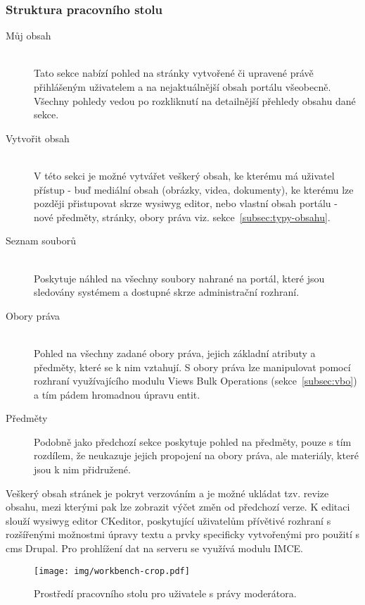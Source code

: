 \subsubsection*{Struktura pracovního stolu}
\begin{description}
  \item[Můj obsah] \hfill \\
  Tato sekce nabízí pohled na stránky vytvořené či upravené právě přihlášeným uživatelem a na nejaktuálnější obsah portálu všeobecně. Všechny pohledy vedou po rozkliknutí na detailnější přehledy obsahu dané sekce.  
  \item [Vytvořit obsah] \hfill \\
  V této sekci je možné vytvářet veškerý obsah, ke kterému má uživatel přístup - buď mediální obsah (obrázky, videa, dokumenty), ke kterému lze později přistupovat skrze \gls{wysiwyg} editor, nebo vlastní obsah portálu - nové předměty, stránky, obory práva viz. sekce~\ref{subsec:typy-obsahu}.
  \item [Seznam souborů] \hfill \\
  Poskytuje náhled na všechny soubory nahrané na portál, které jsou sledovány systémem a dostupné skrze administrační rozhraní.
  \item [Obory práva] \hfill \\
  Pohled na všechny zadané obory práva, jejich základní atributy a předměty, které se k nim vztahují. S obory práva lze manipulovat pomocí rozhraní využívajícího modulu Views Bulk Operations (sekce~\ref{subsec:vbo}) a tím pádem hromadnou úpravu entit.
  \item [Předměty]
  Podobně jako předchozí sekce poskytuje pohled na předměty, pouze s tím rozdílem, že neukazuje jejich propojení na obory práva, ale materiály, které jsou k nim přidružené.
\end{description}

Veškerý obsah stránek je pokryt verzováním a je možné ukládat tzv. revize obsahu, mezi kterými pak lze zobrazit výčet změn od předchozí verze. K editaci slouží \gls{wysiwyg} editor CKeditor, poskytující uživatelům přívětivé rozhraní s rozšířenými možnostmi úpravy textu a prvky specificky vytvořenými pro použití s \gls{cms} Drupal. Pro prohlížení dat na serveru se využívá modulu IMCE.

\begin{figure}[htp]
  \texttt{[image: img/workbench-crop.pdf]}
  \caption{Prostředí pracovního stolu pro uživatele s právy moderátora.}
  \label{fig:workbench}
\end{figure}  
